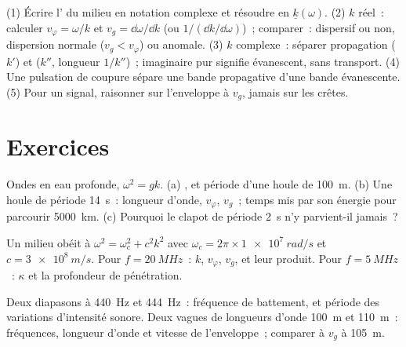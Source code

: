 \begin{method}\label{met:b2:dispersion-wave-packets:method}
(1) Écrire l' du milieu en notation complexe et
résoudre en $\underline k(\omega)$. (2) $k$ réel~: calculer $v_\varphi = \omega/k$ et
$v_g = \dd\omega/\dd k$ (ou $1/(\dd k/\dd\omega)$)~; comparer~: dispersif ou non,
dispersion normale ($v_g < v_\varphi$) ou anomale. (3) $k$ complexe~: séparer
propagation ($k'$) et  ($k''$, longueur $1/k''$)~; imaginaire
pur signifie évanescent, sans transport. (4) Une pulsation de coupure
sépare une bande propagative d'une bande évanescente. (5) Pour un signal,
raisonner sur l'enveloppe à $v_g$, jamais sur les crêtes.
\end{method}

\section{Exercices}

\begin{exercise}[$\star$]\label{exo:b2:dispersion-wave-packets:1}
Ondes en eau profonde, $\omega^2 = gk$. (a) ,  et
période d'une houle de \qty{100}{m}. (b) Une houle de période \qty{14}{s}~:
longueur d'onde, $v_\varphi$, $v_g$~; temps mis par son énergie pour parcourir \qty{5000}{km}.
(c) Pourquoi le clapot de période \qty{2}{s} n'y parvient-il jamais~?
\end{exercise}

\begin{exercise}[$\star$]\label{exo:b2:dispersion-wave-packets:2}
Un milieu obéit à $\omega^2 = \omega_c^2 + c^2k^2$ avec $\omega_c = 2\pi \times \qty{1e7}{rad/s}$
et $c = \qty{3e8}{m/s}$. Pour $f = \qty{20}{MHz}$~: $k$, $v_\varphi$, $v_g$, et
leur produit. Pour $f = \qty{5}{MHz}$~: $\kappa$ et la profondeur de pénétration.
\end{exercise}

\begin{exercise}[$\star$]\label{exo:b2:dispersion-wave-packets:3}
Deux diapasons à \qty{440}{Hz} et \qty{444}{Hz}~: fréquence de battement, et
période des variations d'intensité sonore. Deux vagues de longueurs d'onde
\qty{100}{m} et \qty{110}{m}~: fréquences, longueur d'onde et vitesse de
l'enveloppe~; comparer à $v_g$ à \qty{105}{m}.
\end{exercise}

